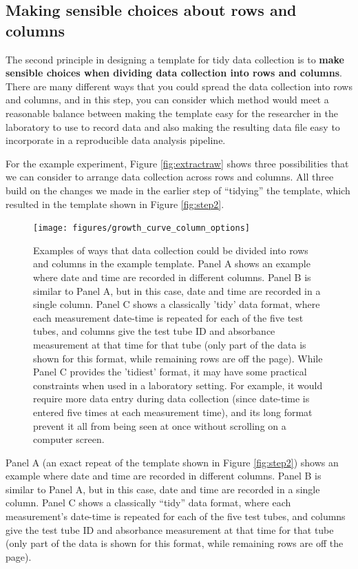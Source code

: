 \documentclass[]{tufte-book}
\begin{document}
\subsection{Making sensible choices about rows and columns}\label{making-sensible-choices-about-rows-and-columns}

The second principle in designing a template for tidy data collection is to
\textbf{make sensible choices when dividing data collection into rows and columns}.
There are many different ways that you could spread the data collection into
rows and columns, and in this step, you can consider which method would meet a
reasonable balance between making the template easy for the researcher in the
laboratory to use to record data and also making the resulting data file easy to
incorporate in a reproducible data analysis pipeline.

For the example experiment, Figure \ref{fig:extractraw} shows three possibilities
that we can consider to arrange data collection across rows and columns.
All three build on the changes we made in the earlier step of ``tidying'' the template,
which resulted in the template shown in Figure \ref{fig:step2}.

\begin{figure}
\texttt{[image: figures/growth\_curve\_column\_options]} \caption[Examples of ways that data collection could be divided into rows and columns in the example template]{Examples of ways that data collection could be divided into rows and columns in the example template. Panel A shows an example where date and time are recorded in different columns. Panel B is similar to Panel A, but in this case, date and time are recorded in a single column. Panel C shows a classically 'tidy' data format, where each measurement date-time is repeated for each of the five test tubes, and columns give the test tube ID and absorbance measurement at that time for that tube (only part of the data is shown for this format, while remaining rows are off the page). While Panel C provides the 'tidiest' format, it may have some practical constraints when used in a laboratory setting. For example, it would require more data entry during data collection (since date-time is entered five times at each measurement time), and its long format prevent it all from being seen at once without scrolling on a computer screen.}\label{fig:columnoptions}
\end{figure}

Panel A (an exact repeat of the template shown in Figure \ref{fig:step2}) shows
an example where date and time are recorded in different columns. Panel B is
similar to Panel A, but in this case, date and time are recorded in a single
column. Panel C shows a classically ``tidy'' data format, where each measurement's
date-time is repeated for each of the five test tubes, and columns give the test
tube ID and absorbance measurement at that time for that tube (only part of the
data is shown for this format, while remaining rows are off the page).
\end{document}
